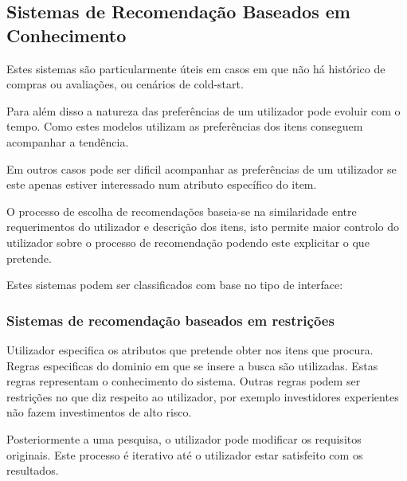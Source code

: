 \subsection{Sistemas de Recomendação Baseados em Conhecimento}
\par\hfill
\par Estes sistemas são particularmente úteis em casos em que não há histórico de compras ou avaliações, ou cenários de cold-start.
\par Para além disso a natureza das preferências de um utilizador pode evoluir com o tempo. Como estes modelos utilizam as preferências dos itens conseguem acompanhar a tendência.
\par Em outros casos pode ser dificil acompanhar as preferências de um utilizador se este apenas estiver interessado num atributo específico do item.
\par O processo de escolha de recomendações baseia-se na similaridade entre requerimentos do utilizador e descrição dos itens, isto permite maior controlo do utilizador sobre o processo de recomendação podendo este explicitar o que pretende.
\par Estes sistemas podem ser classificados com base no tipo de interface: 
\hfill


\subsubsection{Sistemas de recomendação baseados em restrições}
\par\hfill
\par Utilizador especifica os atributos que pretende obter nos itens que procura. Regras especificas do dominio em que se insere a busca são utilizadas. Estas regras representam o conhecimento do sistema. Outras regras podem ser restrições no que diz respeito ao utilizador, por exemplo investidores experientes não fazem investimentos de alto risco. 
\par Posteriormente a uma pesquisa, o utilizador pode modificar os requisitos originais. Este processo é iterativo até o utilizador estar satisfeito com os resultados.



